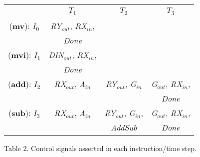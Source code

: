 \documentclass[epsfig,10pt,fullpage]{article}
\begin{document}
\begin{center}
\begin{tabular}{c|c|c|c|}
 \multicolumn{1}{c}{~} & \multicolumn{1}{c}{$T_1$} & \multicolumn{1}{c}{$T_2$} & \multicolumn{1}{c}{$T_3$} \rule[-0.075in]{0in}{0.25in}\\ \cline{2-4}
({\bf mv}): $I_0$ & \rule[-0.075in]{0in}{0.25in}{\it RY$_{out}$}, {\it RX$_{in}$}, &  &  \\ 
~ & {\it Done} &  &  \\ \cline{2-4}
\multicolumn{1}{c|}{({\bf mvi}): $I_1$} & \rule[-0.075in]{0in}{0.25in}{\it DIN$_{out}$},
{\it RX$_{in}$}, &  &  \\ 
~ & {\it Done} &  &  \\ \cline{2-4}
\rule[-0.075in]{0in}{0.25in}({\bf add}): $I_2$ & {\it RX$_{out}$}, {\it A$_{in}$} & {\it
RY$_{out}$}, {\it G$_{in}$} & {\it G$_{out}$}, {\it RX$_{in}$}, \\
~ & ~ & ~ & {\it Done} \\
\cline{2-4}
\rule[-0.075in]{0in}{0.25in}({\bf sub}): $I_3$ & {\it RX$_{out}$}, {\it A$_{in}$} & {\it
RY$_{out}$}, {\it
G$_{in}$}, & {\it G$_{out}$}, {\it RX$_{in}$}, \\
~ & ~ & {\it AddSub} & {\it Done} \\
\cline{2-4}
\end{tabular}
\end{center}

\begin{center}
Table 2. Control signals asserted in each instruction/time step.
\end{center}
\end{document}
